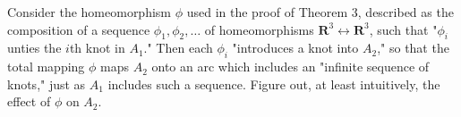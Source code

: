 Consider the homeomorphism $\phi$ used in the proof of Theorem 3, described as the composition of a sequence $\phi_1, \phi_2, \ldots$ of homeomorphisms $\mathbf{R}^3 \leftrightarrow \mathbf{R}^3$, such that "$\phi_i$ unties the $i$th knot in $A_1$." Then each $\phi_i$ "introduces a knot into $A_2$," so that the total mapping $\phi$ maps $A_2$ onto an arc which includes an "infinite sequence of knots," just as $A_1$ includes such a sequence. Figure out, at least intuitively, the effect of $\phi$ on $A_2$.
